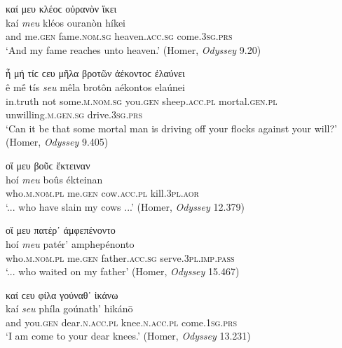 \begin{exe}
\ex καί μευ κλέοϲ οὐρανὸν ἵκει\\
\gll kaí \emph{meu} kléos ouranòn híkei\\
and me.\textsc{gen} fame.\textsc{nom.sg} heaven.\textsc{acc.sg} come.\textsc{3sg.prs}\\
\trans `And my fame reaches unto heaven.' (Homer, \textit{Odyssey} 9.20)
\label{Homer4}
\end{exe}

\begin{exe}
\ex ἦ μή τίϲ ϲευ μῆλα βροτῶν ἀέκοντοϲ ἐλαύνει\\
\gll ê mḗ tís \emph{seu} mêla brotôn aékontos elaúnei\\
in.truth not some.\textsc{m.nom.sg} you.\textsc{gen} sheep.\textsc{acc.pl} mortal.\textsc{gen.pl} unwilling.\textsc{m.gen.sg} drive.\textsc{3sg.prs}\\
\trans `Can it be that some mortal man is driving off your flocks against your will?' (Homer, \textit{Odyssey} 9.405)
\label{Homer5}
\end{exe}

\begin{exe}
\ex οἵ μευ βοῦϲ ἔκτειναν\\
\gll hoí \emph{meu} boûs ékteinan\\
who.\textsc{m.nom.pl} me.\textsc{gen} cow.\textsc{acc.pl} kill.\textsc{3pl.aor}\\
\trans `... who have slain my cows ...' (Homer, \textit{Odyssey} 12.379)
\label{Homer6}
\end{exe}

\begin{exe}
\ex οἵ μευ πατέρ᾽ ἀμφεπένοντο\\
\gll hoí \emph{meu} patér' amphepénonto\\
who.\textsc{m.nom.pl} me.\textsc{gen} father.\textsc{acc.sg} serve.\textsc{3pl.imp.pass}\\
\trans `... who waited on my father' (Homer, \textit{Odyssey} 15.467)
\label{Homer7}
\end{exe}

\begin{exe}
\ex καί ϲευ φίλα γούναθ᾽ ἱκάνω\\
\gll kaí \emph{seu} phíla goúnath' hikánō\\
and you.\textsc{gen} dear.\textsc{n.acc.pl} knee.\textsc{n.acc.pl} come.\textsc{1sg.prs}\\
\trans `I am come to your dear knees.' (Homer, \textit{Odyssey} 13.231)
\label{Homer8}
\end{exe}

